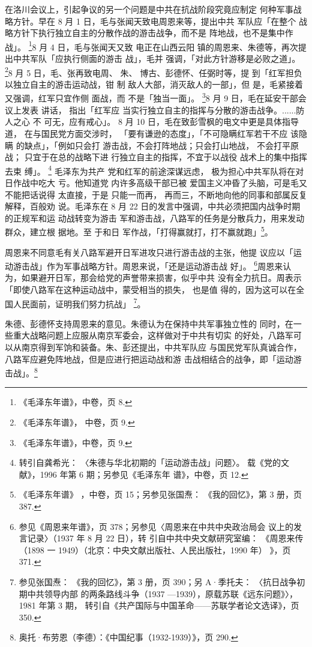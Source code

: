 在洛川会议上，引起争议的另一个问题是中共在抗战阶段究竟应制定 何种军事战
略方针。早在 8 月 1 日，毛与张闻天致电周恩来等，提出中共 军队应「在整个
战略方针下执行独立自主的分散作战的游击战争，而不是 阵地战，也不是集中作
战」。 \footnote{《毛泽东年谱》，中卷，页 8.}8 月 4 日，毛与张闻天又致
电正在山西云阳 镇的周恩来、朱德等，再次提出中共军队「应执行侧面的游击
战」，毛并 强调，「对此方针游移是必败之道」。\footnote{《毛泽东年谱》，
中卷，页 9.}8 月 5 日，毛、张再致电周、 朱、 博古、彭德怀、任弼时等，提
到「红军担负以独立自主的游击运动战，钳 制 敌人大部，消灭敌人的一部」，但
是，毛紧接着又强调，红军只宜作侧 面战，而 不是「独当一面」。
\footnote{《毛泽东年谱》，中卷，页 9.}8 月 9 日，毛在延安干部会议上发表
讲话， 指出「红军应 当实行独立自主的指挥与分散的游击战争。......防人之心
不 可无，应有戒心」。 8 月 10 日，毛在致彭雪枫的电文中更是具体指导道，
在与国民党方面交涉时， 「要有谦逊的态度」，「不可隐瞒红军若干不应 该隐瞒
的缺点」，「例如只会打 游击战，不会打阵地战；只会打山地战， 不会打平原战；
只宜于在总的战略下进 行独立自主的指挥，不宜于以战役 战术上的集中指挥去束
缚」。 \footnote{转引自龚希光： 〈朱德与华北初期的「运动游击战」问题〉。
载《党的文献》，1996 年第 6 期；另参见《毛泽东年 谱》，中卷，页 12.}
毛泽东为共产 党和红军的前途深谋远虑， 极为担心中共军队将在对日作战中吃大
亏。他知道党 内许多高级干部已被 爱国主义冲昏了头脑，可是毛又不能把话说得
太直接，于是 只能一而再， 再而三，不断地向他的同事和部属反复解释，百般劝
说。毛泽东在 8 月 22 日的发言中强调，中共必须把国内战争时期的正规军和运
动战转变为游击 军和游击战，八路军的任务是分散兵力，用来发动群众，建立根
据地。至 于和日 军作战，「打得赢就打，打不赢就跑」\footnote{《毛泽东年谱》
，中卷，页 15；另参见张国焘： 《我的回忆》，第 3 册，页 387.}。

周恩来不同意毛有关八路军避开日军进攻只进行游击战的主张，他提 议应以「运
动游击战」作为军事战略方针。周恩来说，「还是运动游击战 好」。
\footnote{参见《周恩来年谱》，页 378；另参见〈周恩来在中共中央政治局会
议上的发言记录〉（1937 年 8 月 22 日），转 引自中共中央文献研究室编：
《周恩来传（1898 一 1949）（北京：中央文献出版社、人民出版社，1990 年）
》，页 371.}周恩来认为，如果避开日军，那会给党的声誉带来损害，似乎中共
没有全力抗日。周表示「即使八路军在这种运动战中，蒙受相当的损失， 也是值
得的，因为这可以在全国人民面前，证明我们努力抗战」 \footnote{参见张国焘：
《我的回忆》，第 3 册，页 390；另 A·季托夫： 〈抗日战争初期中共领导内部
的两条路线斗争（1937 —1939），原载苏联《远东问题》〉，1981 年第 3 期，
转引自《共产国际与中国革命——苏联学者论文选译》，页 350.}。

朱德、彭德怀支持周恩来的意见。朱德认为在保持中共军事独立性的 同时，在一
些重大战略问题上应服从南京军委会，这样做对于中共有切实 的好处，八路军可
以从南京得到军饷和装备。朱、彭还提出，中共军队应 与国民党军队真诚合作，
八路军应避免阵地战，但是应进行把运动战和游 击战相结合的战争，即「运动游
击战」。\footnote{奥托·布劳恩（李德）：《中国纪事（1932-1939）》，页 290.} 
 
